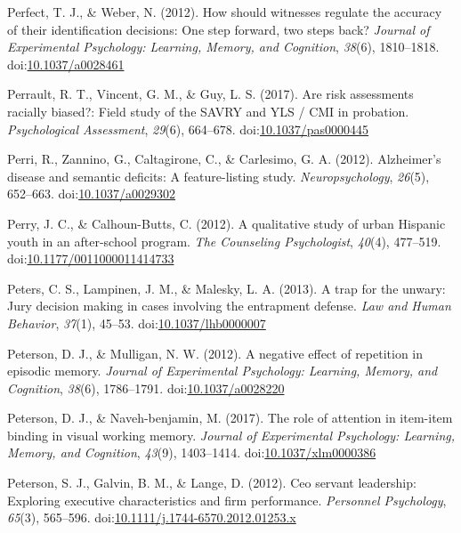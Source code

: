 \documentclass[english,man]{apa6}
\theoremstyle{definition}
\theoremstyle{definition}
\theoremstyle{definition}
\theoremstyle{remark}
\begin{document}
\hypertarget{ref-Perfect2012}{}
Perfect, T. J., \& Weber, N. (2012). How should witnesses regulate the
accuracy of their identification decisions: One step forward, two steps
back? \emph{Journal of Experimental Psychology: Learning, Memory, and
Cognition}, \emph{38}(6), 1810--1818.
doi:\href{https://doi.org/10.1037/a0028461}{10.1037/a0028461}

\hypertarget{ref-Perrault2017}{}
Perrault, R. T., Vincent, G. M., \& Guy, L. S. (2017). Are risk
assessments racially biased?: Field study of the SAVRY and YLS / CMI in
probation. \emph{Psychological Assessment}, \emph{29}(6), 664--678.
doi:\href{https://doi.org/10.1037/pas0000445}{10.1037/pas0000445}

\hypertarget{ref-Perri2012}{}
Perri, R., Zannino, G., Caltagirone, C., \& Carlesimo, G. A. (2012).
Alzheimer's disease and semantic deficits: A feature-listing study.
\emph{Neuropsychology}, \emph{26}(5), 652--663.
doi:\href{https://doi.org/10.1037/a0029302}{10.1037/a0029302}

\hypertarget{ref-Perry2012}{}
Perry, J. C., \& Calhoun-Butts, C. (2012). A qualitative study of urban
Hispanic youth in an after-school program. \emph{The Counseling
Psychologist}, \emph{40}(4), 477--519.
doi:\href{https://doi.org/10.1177/0011000011414733}{10.1177/0011000011414733}

\hypertarget{ref-Peters2013}{}
Peters, C. S., Lampinen, J. M., \& Malesky, L. A. (2013). A trap for the
unwary: Jury decision making in cases involving the entrapment defense.
\emph{Law and Human Behavior}, \emph{37}(1), 45--53.
doi:\href{https://doi.org/10.1037/lhb0000007}{10.1037/lhb0000007}

\hypertarget{ref-Peterson2012}{}
Peterson, D. J., \& Mulligan, N. W. (2012). A negative effect of
repetition in episodic memory. \emph{Journal of Experimental Psychology:
Learning, Memory, and Cognition}, \emph{38}(6), 1786--1791.
doi:\href{https://doi.org/10.1037/a0028220}{10.1037/a0028220}

\hypertarget{ref-Peterson2017}{}
Peterson, D. J., \& Naveh-benjamin, M. (2017). The role of attention in
item-item binding in visual working memory. \emph{Journal of
Experimental Psychology: Learning, Memory, and Cognition}, \emph{43}(9),
1403--1414.
doi:\href{https://doi.org/10.1037/xlm0000386}{10.1037/xlm0000386}

\hypertarget{ref-Peterson2012a}{}
Peterson, S. J., Galvin, B. M., \& Lange, D. (2012). Ceo servant
leadership: Exploring executive characteristics and firm performance.
\emph{Personnel Psychology}, \emph{65}(3), 565--596.
doi:\href{https://doi.org/10.1111/j.1744-6570.2012.01253.x}{10.1111/j.1744-6570.2012.01253.x}
\end{document}

